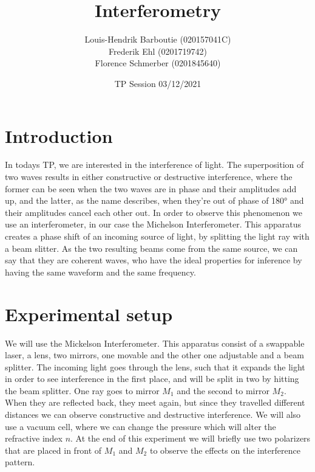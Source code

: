\documentclass{scrartcl}
\title{Interferometry}
\subtitle{ }
\date{TP Session 03/12/2021}
\author{Louis-Hendrik Barboutie (020157041C)\\ Frederik Ehl (0201719742) \\ Florence Schmerber (0201845640)}
\begin{document}
\maketitle

\clearpage

\tableofcontents

\listoffigures
	
\clearpage

\section{Introduction}
In todays TP, we are interested in the interference of light. The superposition of two waves results in either constructive or destructive interference, where the former can be seen when the two waves are in phase and their amplitudes add up, and the latter, as the name describes, when they're out of phase of 180° and their amplitudes cancel each other out. In order to observe this phenomenon we use an interferometer, in our case the Michelson Interferometer. This apparatus creates a phase shift of an incoming source of light, by splitting the light ray with a beam slitter. As the two resulting beams come from the same source, we can say that they are coherent waves, who have the ideal properties for inference by having the same waveform and the same frequency.

\section{Experimental setup}
We will use the Mickelson Interferometer. This apparatus consist of a swappable laser, a lens, two mirrors, one movable and the other one adjustable and a beam splitter. The incoming light goes through the lens, such that it expands the light in order to see interference in the first place, and will be split in two by hitting the beam splitter. One ray goes to mirror $M_1$ and the second to mirror $M_2$. When they are reflected back, they meet again, but since they travelled different distances we can observe constructive and destructive interference. 
We will also use a vacuum cell, where we can change the pressure which will alter the refractive index $n$. 
At the end of this experiment we will briefly use two polarizers that are placed in front of $M_1$ 
and $M_2$ to observe the effects on the interference pattern.
\end{document}
